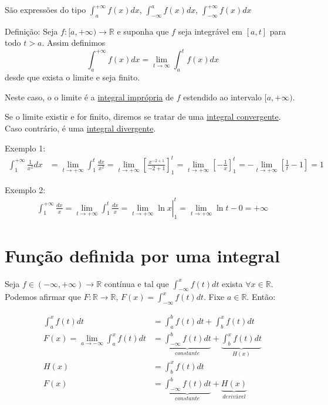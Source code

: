 \documentclass[12pt,openany]{book}
\begin{document}
\hspace{5mm} São expressões do tipo $\displaystyle{\int_a^{+ \infty}f(x)dx}$, $\displaystyle{\int_{-\infty}^{a} f(x)dx}$, $\displaystyle{\int_{-\infty}^{+ \infty}f(x)dx}$\\
\vspace{15pt}

Definição: Seja $f:{[a,+\infty)}\rightarrow \mathds{R}$ e suponha que $f$ seja integrável em $[a,t]$ para todo $t>a$. Assim definimos $$ \int_a^{+\infty}f(x)dx = \lim_{t\rightarrow\infty}\int_a^t f(x)dx$$ desde que exista o limite e seja finito.

Neste caso, o o limite é a \underline{integral imprópria} de $f$ estendido ao intervalo $[a,+\infty)$.

Se o limite existir e for finito, diremos se tratar de uma \underline{integral convergente}. Caso contrário, é uma \underline{integral divergente}.

Exemplo 1:
\begin{align*}
\int_1^{+\infty}\frac{1}{x^2}dx &= \lim_{t\rightarrow + \infty}\int_1^t \frac{dx}{x^2}=\lim_{t\rightarrow + \infty}\left[\frac{x^{-2+1}}{-2+1}\right]_1^t = \lim_{t\rightarrow + \infty}\left[-\frac{1}{x}\right]_1^t = -\lim_{t\rightarrow + \infty}\left[\frac{1}{t}-1\right]=1
\end{align*}

Exemplo 2:
\begin{align*}
\int_1^{+\infty}\frac{dx}{x}= \lim_{t\rightarrow + \infty}\int_1^t\frac{dx}{x}= \left.\lim_{t\rightarrow + \infty}\ln x \right|_1^t = \lim_{t\rightarrow + \infty}\ln t - 0 = +\infty
\end{align*}

\section{Função definida por uma integral}
\label{sec:s22}

\hspace{5mm} Seja $f \in (-\infty, +\infty) \rightarrow \mathds{R}$ contínua e tal que $\displaystyle{\int_{-\infty}^x f(t)dt}$ exista $\displaystyle{\forall x \in \mathds{R}}$. Podemos afirmar que $F:\mathds{R}\rightarrow\mathds{R}$, $\displaystyle{F(x)=\int_{-\infty}^x f(t)dt}$. Fixe $a \in \mathds{R}$. Então:

\begin{align*}
\int_a^x f(t)dt &= \int_a^b f(t)dt + \int_b^x f(t)dt \\
F(x) = \lim_{a\rightarrow - \infty}\int_a^xf(t)dt &= \underbrace{\int_{-\infty}^b f(t)dt}_{constante} + \underbrace{\int_b^x f(t)dt}_{H(x)}\\
H(x) &= \int_b^x f(t)dt \\
F(x) &= \underbrace{\int_{-\infty}^b f(t)dt}_{constante}+ \underbrace{H(x)}_{derivável} 
\end{align*}
\end{document}
